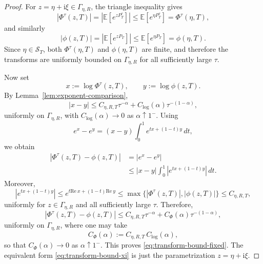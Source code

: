 \documentclass[letterpaper]{article}
\numberwithin{equation}{section}
\theoremstyle{definition}
\theoremstyle{remark}
\newcommand{\E}{\mathbb{E}}
\newcommand{\ii}{\mathrm{i}}
\begin{document}
\begin{proof}
For $z=\eta+\ii\xi\in\Gamma_{\eta,R}$, the triangle inequality gives
\[
  |\Phi^\tau(z,T)|
  =
  \left|\E\!\left[e^{zP_T^\tau}\right]\right|
  \le
  \E\!\left[e^{\eta P_T^\tau}\right]
  =
  \Phi^\tau(\eta,T),
\]
and similarly
\[
  |\phi(z,T)|
  =
  \left|\E\!\left[e^{zP_T}\right]\right|
  \le
  \E\!\left[e^{\eta P_T}\right]
  =
  \phi(\eta,T).
\]
Since $\eta\in\mathcal S_T$, both $\Phi^\tau(\eta,T)$ and $\phi(\eta,T)$ are finite,
and therefore the transforms are uniformly bounded on $\Gamma_{\eta,R}$ for all
sufficiently large $\tau$.

Now set
\[
  x:=\log\Phi^\tau(z,T),
  \qquad
  y:=\log\phi(z,T).
\]
By Lemma~\ref{lem:exponent-comparison},
\[
  |x-y|
  \le
  C_{\eta,R,T}\tau^{-\alpha}
  +
  C_{\log}(\alpha)\tau^{-(1-\alpha)},
\]
uniformly on $\Gamma_{\eta,R}$, with $C_{\log}(\alpha)\to0$ as
$\alpha\uparrow1^-$. Using
\[
  e^x-e^y=(x-y)\int_0^1 e^{tx+(1-t)y}\,dt,
\]
we obtain
\begin{align*}
  |\Phi^\tau(z,T)-\phi(z,T)|
  &=
  |e^x-e^y|
  \\
  &\le
  |x-y|
  \int_0^1 \left|e^{tx+(1-t)y}\right|\,dt.
\end{align*}
Moreover,
\[
  \left|e^{tx+(1-t)y}\right|
  \le
  e^{t\mathrm{Re}\ x+(1-t)\mathrm{Re}\ y}
  \le
  \max\{|\Phi^\tau(z,T)|,|\phi(z,T)|\}
  \le C_{\eta,R,T},
\]
uniformly for $z\in\Gamma_{\eta,R}$ and all sufficiently large $\tau$.
Therefore,
\[
  |\Phi^\tau(z,T)-\phi(z,T)|
  \le
  C_{\eta,R,T}\tau^{-\alpha}
  +
  C_{\Phi}(\alpha)\tau^{-(1-\alpha)},
\]
uniformly on $\Gamma_{\eta,R}$, where one may take
\[
  C_{\Phi}(\alpha):=C_{\eta,R,T}\,C_{\log}(\alpha),
\]
so that $C_{\Phi}(\alpha)\to0$ as $\alpha\uparrow1^-$.
This proves \eqref{eq:transform-bound-fixed}. The equivalent form
\eqref{eq:transform-bound-xi} is just the parametrization $z=\eta+\ii\xi$.
\end{proof}
\end{document}
